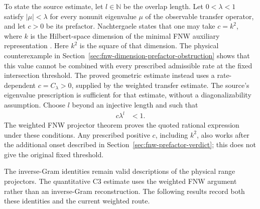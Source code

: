 \documentclass{article}
\begin{document}
To state the source estimate, let $l\in\mathbb N$ be the overlap length. Let
$0<\lambda<1$ satisfy $|\mu|<\lambda$ for every nonunit eigenvalue $\mu$
of the observable transfer operator, and let $c>0$ be its prefactor.
Nachtergaele states that one may take $c=k^2$, where $k$ is the Hilbert-space
dimension of the minimal FNW auxiliary representation
\cite[Section~6]{Nachtergaele1996Spectral}. Here $k^2$ is the square of that
dimension. The physical counterexample in
Section~\ref{sec:fnw-dimension-prefactor-obstruction} shows that this value
cannot be combined with every prescribed admissible rate at the fixed
intersection threshold. The proved geometric estimate instead uses a
rate-dependent $c=C_\lambda>0$, supplied by the weighted transfer estimate.
The source's eigenvalue prescription is sufficient for that estimate, without
a diagonalizability assumption. Choose $l$ beyond an injective length and such that
\begin{align}
    c\lambda^l
     & <1.
    \label{eq:cpgsv21_martingale_overlap_source_transfer_smallness}
\end{align}
The weighted FNW projector theorem proves the quoted rational expression
under these conditions. Any prescribed positive $c$, including $k^2$, also
works after the additional onset described in
Section~\ref{sec:fnw-prefactor-verdict}; this does not give the original fixed
threshold.

The inverse-Gram identities remain valid descriptions of the physical range
projectors. The quantitative C3 estimate uses the weighted FNW argument rather
than an inverse-Gram reconstruction. The following results record both these
identities and the current weighted route.
\end{document}
